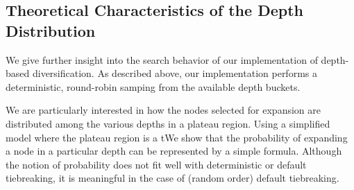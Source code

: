 
\subsection{Theoretical Characteristics of the Depth Distribution}
\label{sec:theoretical-characteristics}

We give further insight into the search behavior of our implementation
of depth-based diversification.
As described above, our implementation performs a deterministic, round-robin samping from the available depth buckets.

We are particularly interested in how the nodes selected for expansion are distributed 
among the various depths in a plateau region.
Using a simplified model where the plateau region is a tWe show that the probability of expanding a node in a particular depth
can be represented by a simple formula.  Although the notion of
probability does not fit well with deterministic \fifo or \lifo
default tiebreaking, it is meaningful in the case of \ro (random
order) default tiebreaking.


